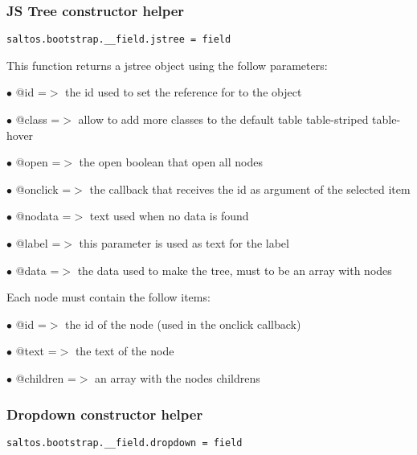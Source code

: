 \documentclass[a4paper]{article}
\begin{document}
\hypertarget{toc649}{}
\subsubsection{JS Tree constructor helper}

\begin{lstlisting}
saltos.bootstrap.__field.jstree = field
\end{lstlisting}

This function returns a jstree object using the follow parameters:

\begin{compactitem}
\item[\color{myblue}$\bullet$] @id      =$>$ the id used to set the reference for to the object
\item[\color{myblue}$\bullet$] @class    =$>$ allow to add more classes to the default table table-striped table-hover
\item[\color{myblue}$\bullet$] @open    =$>$ the open boolean that open all nodes
\item[\color{myblue}$\bullet$] @onclick =$>$ the callback that receives the id as argument of the selected item
\item[\color{myblue}$\bullet$] @nodata   =$>$ text used when no data is found
\item[\color{myblue}$\bullet$] @label    =$>$ this parameter is used as text for the label
\item[\color{myblue}$\bullet$] @data    =$>$ the data used to make the tree, must to be an array with nodes
\end{compactitem}

Each node must contain the follow items:

\begin{compactitem}
\item[\color{myblue}$\bullet$] @id       =$>$ the id of the node (used in the onclick callback)
\item[\color{myblue}$\bullet$] @text     =$>$ the text of the node
\item[\color{myblue}$\bullet$] @children =$>$ an array with the nodes childrens
\end{compactitem}

\hypertarget{toc650}{}
\subsubsection{Dropdown constructor helper}

\begin{lstlisting}
saltos.bootstrap.__field.dropdown = field
\end{lstlisting}
\end{document}
